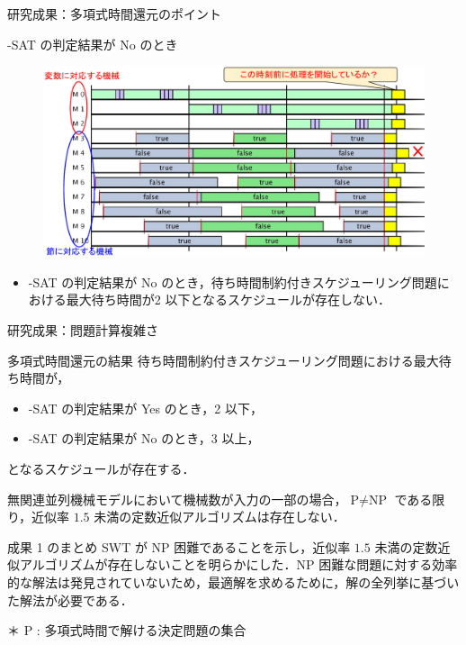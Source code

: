 \documentclass[dvipdfmx]{beamer}
\begin{document}
    \begin{frame}{研究成果：多項式時間還元のポイント}
      \begin{block}{{-SAT} の判定結果が No のとき}
        \begin{figure}[h]
          \centering
          \includegraphics[width=12cm]{figure/reduction2.pdf}
        \end{figure}
      \end{block}
      \begin{itemize}
        \setlength{\leftskip}{-3mm}
        \item {-SAT} の判定結果が \alert{No} のとき，待ち時間制約付きスケジューリング問題における最大待ち時間が\alert{2 以下}となるスケジュールが\alert{存在しない}．
      \end{itemize}
    \end{frame}

    \begin{frame}{研究成果：問題計算複雑さ}
      \begin{block}{多項式時間還元の結果}
        待ち時間制約付きスケジューリング問題における最大待ち時間が，
        \begin{itemize}
          \item {-SAT} の判定結果が \alert{Yes} のとき，\alert{2 以下}，
          \item {-SAT} の判定結果が \alert{No} のとき，\alert{3 以上}，
        \end{itemize}
        となるスケジュールが存在する．
      \end{block}
      無関連並列機械モデルにおいて機械数が入力の一部の場合，$\text{P} \neq \text{NP}$ である限り，近似率 $1.5$ 未満の定数近似アルゴリズムは存在しない．
      \begin{alertblock}{成果 1 のまとめ}
        SWT が NP 困難であることを示し，近似率 $1.5$ 未満の定数近似アルゴリズムが存在しないことを明らかにした．NP 困難な問題に対する効率的な解法は発見されていないため，最適解を求めるために，解の全列挙に基づいた解法が必要である．
      \end{alertblock}
      ＊ P : 多項式時間で解ける決定問題の集合
    \end{frame}
\end{document}
